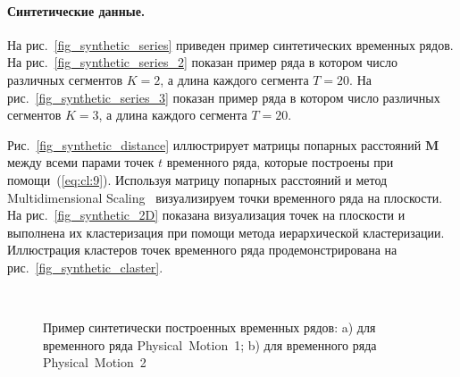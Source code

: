 \paragraph{Синтетические данные.}


На рис.~\ref{fig_synthetic_series} приведен пример синтетических временных рядов. 
На рис.~\ref{fig_synthetic_series_2} показан пример ряда в котором число различных сегментов $K = 2$, а длина каждого сегмента $T = 20$. 
На рис.~\ref{fig_synthetic_series_3} показан пример ряда в котором число различных сегментов $K = 3$, а длина каждого сегмента $T = 20$. 

Рис.~\ref{fig_synthetic_distance} иллюстрирует матрицы попарных расстояний $\textbf{M}$ между всеми парами точек $t$ временного ряда, которые построены при помощи~(\ref{eq:cl:9}). 
Используя матрицу попарных расстояний и метод Multidimensional Scaling~\cite{Borg2005} визуализируем точки временного ряда на плоскости. 
На рис.~\ref{fig_synthetic_2D} показана визуализация точек на плоскости и выполнена их кластеризация при помощи метода иерархической кластеризации. 
Иллюстрация кластеров точек временного ряда продемонстрирована на рис.~\ref{fig_synthetic_claster}.

\begin{figure}[h!t]\center
{}
\\
\caption{Пример синтетически построенных временных рядов: a) для временного ряда Physical~Motion~1; b) для временного ряда Physical~Motion~2}
\label{fig_real_series}
\end{figure}

